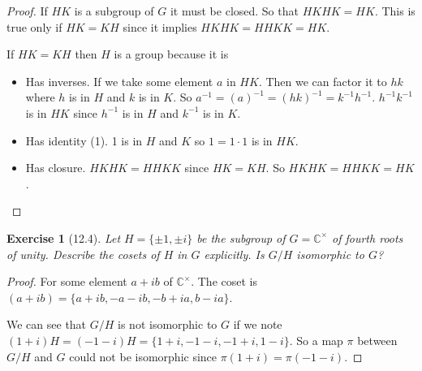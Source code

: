 \documentclass[12pt]{article}
\newtheorem*{exer}{Exercise}
\begin{document}
\begin{proof}

    If $HK$ is a subgroup of $G$ it must be closed. So that $HKHK = HK$.
    This is true only if $HK = KH$ since it implies $HKHK = HHKK = HK$.

    If $HK = KH$ then $H$ is a group because it is
    \begin{itemize}
        \item Has inverses. If we take some element $a$ in $HK$. Then we
            can factor it to $hk$ where $h$ is in $H$ and $k$ is in $K$.
            So $a^{-1} = (a)^{-1} = (hk)^{-1} = k^{-1} h^{-1}$.
            $h^{-1}k^{-1}$ is in $HK$ since $h^{-1}$ is in $H$ and
            $k^{-1}$ is in $K$.

        \item Has identity (1). 1 is in $H$ and $K$ so $1 = 1 \cdot 1$
            is in $HK$.

        \item Has closure.  $HKHK = HHKK$ since $HK = KH$. So $HKHK =
            HHKK = HK$.

    \end{itemize}

\end{proof}


\begin{exer}[12.4]
Let $H=\{\pm1, \pm i\}$ be the subgroup of $G=\mathbb C^\times$ of
fourth roots of unity. Describe the cosets of $H$ in $G$ explicitly. Is
$G/H$ isomorphic to $G$?
\end{exer}

\begin{proof}

    For some element $a + ib$ of $\mathbb{C}^\times$. The coset is
    $(a + ib) = \{a + ib, -a - ib, -b + ia, b - ia\}$. 

    We can see that $G/H$ is not isomorphic to $G$ if we note $(1 + i)H
    = (-1 - i)H = \{1 + i, -1 - i, -1 + i, 1 - i\}$. So a map $\pi$
    between $G/H$ and $G$ could not be isomorphic since $\pi(1 + i) =
    \pi(-1 - i)$.

\end{proof}

\end{document}
